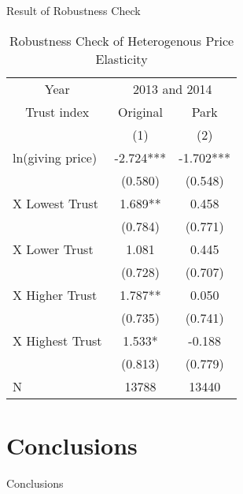 \documentclass[
  ignorenonframetext,
]{beamer}
\begin{document}
\begin{frame}{Result of Robustness Check}
\protect\hypertarget{result-of-robustness-check}{}
\begin{table}

\caption{\label{tab:kableRobust1EstimateInteractionByTrustGroup}Robustness Check of Heterogenous Price Elasticity}
\centering
\fontsize{8}{10}\selectfont
\begin{tabular}[t]{lcc}
\toprule
\multicolumn{1}{c}{Year} & \multicolumn{2}{c}{2013 and 2014} \\
\cmidrule(l{3pt}r{3pt}){1-1} \cmidrule(l{3pt}r{3pt}){2-3}
\multicolumn{1}{c}{Trust index} & \multicolumn{1}{c}{Original} & \multicolumn{1}{c}{Park} \\
\cmidrule(l{3pt}r{3pt}){1-1} \cmidrule(l{3pt}r{3pt}){2-2} \cmidrule(l{3pt}r{3pt}){3-3}
 & (1) & (2)\\
\midrule
ln(giving price) & -2.724*** & -1.702***\\
 & (0.580) & (0.548)\\
\hspace{1em}X Lowest Trust & 1.689** & 0.458\\
\hspace{1em} & (0.784) & (0.771)\\
\hspace{1em}X Lower Trust & 1.081 & 0.445\\
\hspace{1em} & (0.728) & (0.707)\\
\hspace{1em}X Higher Trust & 1.787** & 0.050\\
\hspace{1em} & (0.735) & (0.741)\\
\hspace{1em}X Highest Trust & 1.533* & -0.188\\
\hspace{1em} & (0.813) & (0.779)\\
N & 13788 & 13440\\
\bottomrule
\end{tabular}
\end{table}
\end{frame}

\hypertarget{conclusions}{%
\section{Conclusions}\label{conclusions}}

\begin{frame}{Conclusions}
\protect\hypertarget{conclusions-1}{}
\end{frame}
\end{document}
